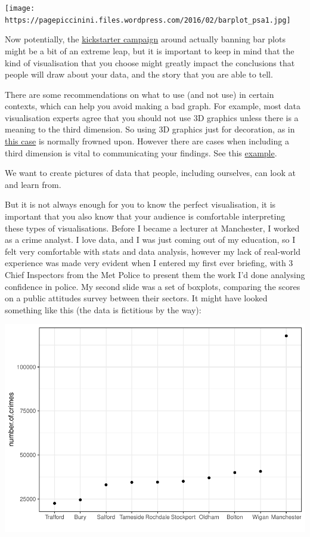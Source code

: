 \documentclass[
]{book}
\begin{document}
\texttt{[image: https://pagepiccinini.files.wordpress.com/2016/02/barplot\_psa1.jpg]}

Now potentially, the \href{https://www.kickstarter.com/projects/1474588473/barbarplots/description}{kickstarter campaign} around actually banning bar plots might be a bit of an extreme leap, but it is important to keep in mind that the kind of visualisation that you choose might greatly impact the conclusions that people will draw about your data, and the story that you are able to tell.

There are some recommendations on what to use (and not use) in certain contexts, which can help you avoid making a bad graph. For example, most data visualisation experts agree that you should not use 3D graphics unless there is a meaning to the third dimension. So using 3D graphics just for decoration, as in \href{https://mir-s3-cdn-cf.behance.net/project_modules/disp/2505dd10837923.56030acd2ef20.jpg}{this case} is normally frowned upon. However there are cases when including a third dimension is vital to communicating your findings. See this \href{http://www.visualisingdata.com/2015/03/when-3d-works/}{example}.

We want to create pictures of data that people, including ourselves, can look at and learn from.

But it is not always enough for you to know the perfect visualisation, it is important that you also know that your audience is comfortable interpreting these types of visualisations. Before I became a lecturer at Manchester, I worked as a crime analyst. I love data, and I was just coming out of my education, so I felt very comfortable with stats and data analysis, however my lack of real-world experience was made very evident when I entered my first ever briefing, with 3 Chief Inspectors from the Met Police to present them the work I'd done analysing confidence in police. My second slide was a set of boxplots, comparing the scores on a public attitudes survey between their sectors. It might have looked something like this (the data is fictitious by the way):

\includegraphics{bookdown-demo_files/figure-latex/unnamed-chunk-24-1.pdf}
\end{document}
